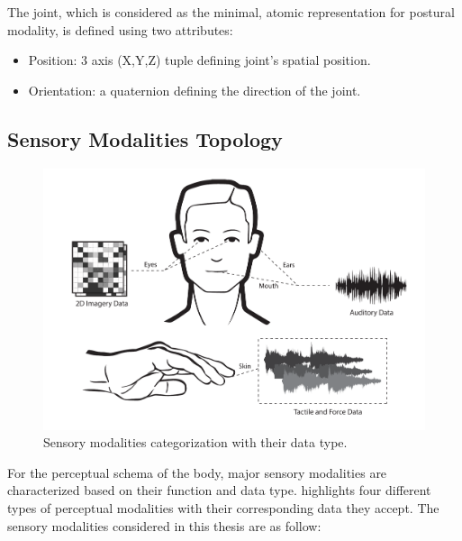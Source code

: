 The joint, which is considered as the minimal, atomic representation for postural modality, is defined using two attributes:
\begin{itemize}
  \setlength\itemsep{0em}
\item Position: 3 axis (X,Y,Z) tuple defining joint's spatial position.
\item Orientation: a quaternion defining the direction of the joint. 
\end{itemize}

\pagebreak
\subsection{Sensory Modalities Topology}

\begin{figure}[b!]
  \centering
  \includegraphics[width=1\linewidth]{figures/concept/PerceptualDataType.pdf}
  \captionsetup{justification=centering}
  \caption{Sensory modalities categorization with their data type.}
  \label{fig:concept-SensoryModalities}
\end{figure}

For the perceptual schema of the body, major sensory modalities are characterized based on their function and data type.  highlights four different types of perceptual modalities with their corresponding data they accept. The sensory modalities considered in this thesis are as follow:

